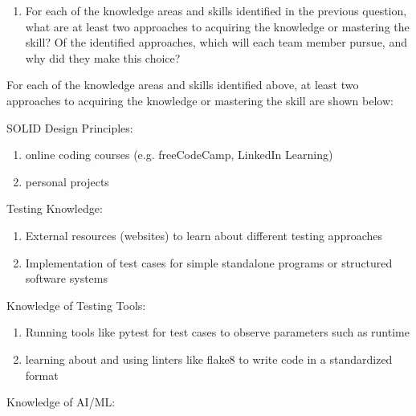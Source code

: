 \documentclass[12pt, titlepage]{article}
\begin{document}
\begin{enumerate}[label=\arabic*., resume*=ar]
  \item For each of the knowledge areas and skills identified in the previous
  question, what are at least two approaches to acquiring the knowledge or
  mastering the skill?  Of the identified approaches, which will each team
  member pursue, and why did they make this choice? \\
\end{enumerate}

For each of the knowledge areas and skills identified above, at least two approaches to acquiring the knowledge or mastering the skill are shown below:
\begin{enumerate}
    \begin{item}
        SOLID Design Principles:
        \begin{enumerate}
            \item online coding courses (e.g. freeCodeCamp, LinkedIn Learning)
            \item personal projects
        \end{enumerate}
    \end{item}
    \begin{item}
        Testing Knowledge:
        \begin{enumerate}
            \item External resources (websites) to learn about different testing approaches
            \item Implementation of test cases for simple standalone programs or structured software systems
        \end{enumerate}
    \end{item}
    \begin{item}
        Knowledge of Testing Tools:
        \begin{enumerate}
            \item Running tools like pytest for test cases to observe parameters such as runtime
            \item learning about and using linters like flake8 to write code in a standardized format
        \end{enumerate}
    \end{item}
    \begin{item}
        Knowledge of AI/ML:
        
    \end{item}
\end{enumerate}
\end{document}

